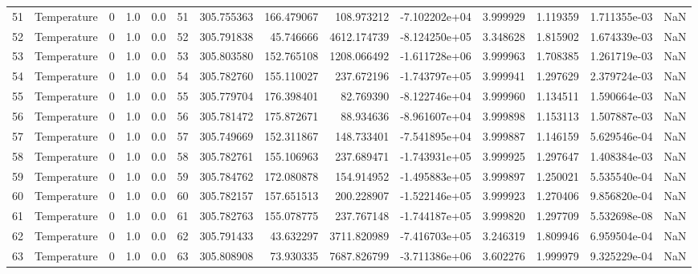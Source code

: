 \begin{tabular}{llrrrrrrrrrrrr}
51  &  Temperature &       0 &  1.0 &  0.0 &   51 &  305.755363 &   166.479067 &     108.973212 & -7.102202e+04 &  3.999929 &  1.119359 &  1.711355e-03 &      NaN \\
52  &  Temperature &       0 &  1.0 &  0.0 &   52 &  305.791838 &    45.746666 &    4612.174739 & -8.124250e+05 &  3.348628 &  1.815902 &  1.674339e-03 &      NaN \\
53  &  Temperature &       0 &  1.0 &  0.0 &   53 &  305.803580 &   152.765108 &    1208.066492 & -1.611728e+06 &  3.999963 &  1.708385 &  1.261719e-03 &      NaN \\
54  &  Temperature &       0 &  1.0 &  0.0 &   54 &  305.782760 &   155.110027 &     237.672196 & -1.743797e+05 &  3.999941 &  1.297629 &  2.379724e-03 &      NaN \\
55  &  Temperature &       0 &  1.0 &  0.0 &   55 &  305.779704 &   176.398401 &      82.769390 & -8.122746e+04 &  3.999960 &  1.134511 &  1.590664e-03 &      NaN \\
56  &  Temperature &       0 &  1.0 &  0.0 &   56 &  305.781472 &   175.872671 &      88.934636 & -8.961607e+04 &  3.999898 &  1.153113 &  1.507887e-03 &      NaN \\
57  &  Temperature &       0 &  1.0 &  0.0 &   57 &  305.749669 &   152.311867 &     148.733401 & -7.541895e+04 &  3.999887 &  1.146159 &  5.629546e-04 &      NaN \\
58  &  Temperature &       0 &  1.0 &  0.0 &   58 &  305.782761 &   155.106963 &     237.689471 & -1.743931e+05 &  3.999925 &  1.297647 &  1.408384e-03 &      NaN \\
59  &  Temperature &       0 &  1.0 &  0.0 &   59 &  305.784762 &   172.080878 &     154.914952 & -1.495883e+05 &  3.999897 &  1.250021 &  5.535540e-04 &      NaN \\
60  &  Temperature &       0 &  1.0 &  0.0 &   60 &  305.782157 &   157.651513 &     200.228907 & -1.522146e+05 &  3.999923 &  1.270406 &  9.856820e-04 &      NaN \\
61  &  Temperature &       0 &  1.0 &  0.0 &   61 &  305.782763 &   155.078775 &     237.767148 & -1.744187e+05 &  3.999820 &  1.297709 &  5.532698e-08 &      NaN \\
62  &  Temperature &       0 &  1.0 &  0.0 &   62 &  305.791433 &    43.632297 &    3711.820989 & -7.416703e+05 &  3.246319 &  1.809946 &  6.959504e-04 &      NaN \\
63  &  Temperature &       0 &  1.0 &  0.0 &   63 &  305.808908 &    73.930335 &    7687.826799 & -3.711386e+06 &  3.602276 &  1.999979 &  9.325229e-04 &      NaN \\

\end{tabular}

